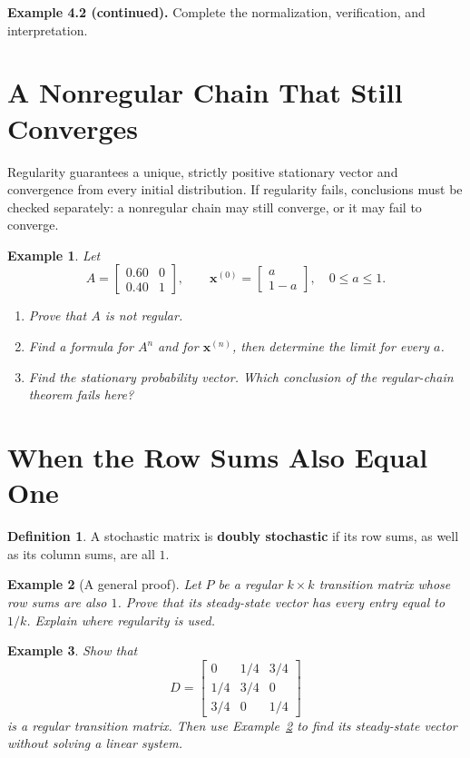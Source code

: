 \documentclass{article}
\theoremstyle{plain}
\newtheorem{example}{Example}[section]
\theoremstyle{definition}
\newtheorem{definition}{Definition}[section]
\theoremstyle{remark}
\renewcommand{\vec}[1]{\mathbf{#1}}
\newcommand{\work}{\par\vfill}
\begin{document}
\newpage
\textbf{Example 4.2 (continued).} Complete the normalization, verification, and interpretation.

\work

\newpage
\section{A Nonregular Chain That Still Converges}
Regularity guarantees a unique, strictly positive stationary vector and convergence from every initial distribution. If regularity fails, conclusions must be checked separately: a nonregular chain may still converge, or it may fail to converge.
\begin{example}\label{ex:nonregular}
Let
\[
A=\begin{bmatrix}0.60&0\\0.40&1\end{bmatrix},\qquad
\vec{x}^{(0)}=\begin{bmatrix}a\\1-a\end{bmatrix},\quad0\le a\le1.
\]
\begin{enumerate}
\item[(a)] Prove that $A$ is not regular.
\item[(b)] Find a formula for $A^n$ and for $\vec{x}^{(n)}$, then determine the limit for every $a$.
\item[(c)] Find the stationary probability vector. Which conclusion of the regular-chain theorem fails here?
\end{enumerate}
\end{example}

\work

\newpage
\section{When the Row Sums Also Equal One}
\begin{definition}
A stochastic matrix is \textbf{doubly stochastic} if its row sums, as well as its column sums, are all $1$.
\end{definition}
\begin{example}[A general proof]\label{ex:uniformproof}
Let $P$ be a regular $k\times k$ transition matrix whose row sums are also $1$. Prove that its steady-state vector has every entry equal to $1/k$. Explain where regularity is used.
\end{example}

\work

\newpage
\begin{example}\label{ex:doubly}
Show that
\[
D=\begin{bmatrix}0&1/4&3/4\\1/4&3/4&0\\3/4&0&1/4\end{bmatrix}
\]
is a regular transition matrix. Then use Example~\ref{ex:uniformproof} to find its steady-state vector without solving a linear system.
\end{example}
\end{document}
